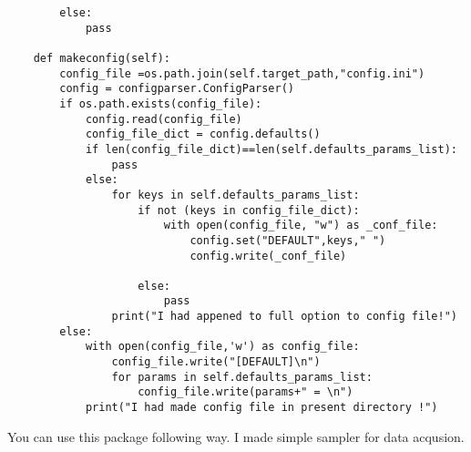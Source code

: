 \begin{verbatim}
        else:
            pass

    def makeconfig(self):
        config_file =os.path.join(self.target_path,"config.ini")
        config = configparser.ConfigParser()
        if os.path.exists(config_file):
            config.read(config_file)
            config_file_dict = config.defaults()
            if len(config_file_dict)==len(self.defaults_params_list):
                pass
            else:
                for keys in self.defaults_params_list:
                    if not (keys in config_file_dict):
                        with open(config_file, "w") as _conf_file: 
                            config.set("DEFAULT",keys," ")
                            config.write(_conf_file)
                            
                    else:
                        pass
                print("I had appened to full option to config file!")
        else:
            with open(config_file,'w') as config_file:
                config_file.write("[DEFAULT]\n")
                for params in self.defaults_params_list:
                    config_file.write(params+" = \n")
            print("I had made config file in present directory !")

\end{verbatim}



You can use this package following way. I made simple sampler for data acqusion.

